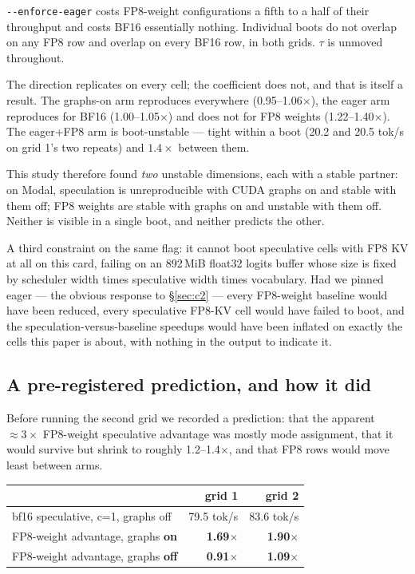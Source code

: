 \documentclass[11pt]{article}
\newcommand{\tw}[1]{\texttt{\small #1}}
\begin{document}
\noindent
\tw{-{}-enforce-eager} costs FP8-weight configurations a fifth to a half of
their throughput and costs BF16 essentially nothing. Individual boots do not
overlap on any FP8 row and overlap on every BF16 row, in both grids. $\tau$
is unmoved throughout.

The direction replicates on every cell; the coefficient does not, and that
is itself a result. The graphs-on arm reproduces everywhere
(0.95--1.06$\times$), the eager arm reproduces for BF16 (1.00--1.05$\times$)
and does not for FP8 weights (1.22--1.40$\times$). The eager+FP8 arm is
boot-unstable --- tight within a boot (20.2 and 20.5 tok/s on grid 1's two
repeats) and $1.4\times$ between them.

This study therefore found \emph{two} unstable dimensions, each with a stable
partner: on Modal, speculation is unreproducible with CUDA graphs on and stable
with them off;
FP8 weights are stable with graphs on and unstable with them off. Neither is
visible in a single boot, and neither predicts the other.

A third constraint on the same flag: it cannot boot speculative cells with
FP8 KV at all on this card, failing on an 892\,MiB float32 logits buffer
whose size is fixed by scheduler width times speculative width times
vocabulary. Had we pinned eager --- the obvious response to \S\ref{sec:c2}
--- every FP8-weight baseline would have been reduced, every speculative
FP8-KV cell would have failed to boot, and the speculation-versus-baseline
speedups would have been inflated on exactly the cells this paper is about,
with nothing in the output to indicate it.

\subsection{A pre-registered prediction, and how it did}

Before running the second grid we recorded a prediction: that the apparent
${\approx}3\times$ FP8-weight speculative advantage was mostly mode
assignment, that it would survive but shrink to roughly 1.2--1.4$\times$, and
that FP8 rows would move least between arms.

\begin{table}[h]\centering\small
\begin{tabular}{lrr}
\toprule
& grid 1 & grid 2\\
\midrule
bf16 speculative, c=1, graphs off & 79.5 tok/s & 83.6 tok/s\\
FP8-weight advantage, graphs \textbf{on} & \textbf{1.69$\times$} & \textbf{1.90$\times$}\\
FP8-weight advantage, graphs \textbf{off} & \textbf{0.91$\times$} & \textbf{1.09$\times$}\\
\bottomrule
\end{tabular}
\end{table}
\end{document}

